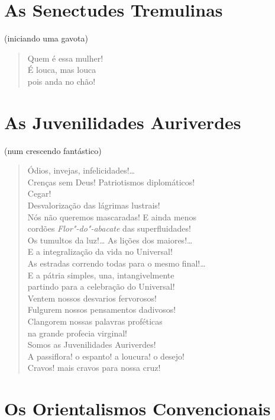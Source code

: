 \medskip
\section*{As Senectudes Tremulinas}

\hfill{}{\small(iniciando uma gavota)}

\begin{verse}
Quem é essa mulher!\\
É louca, mas louca\\
pois anda no chão!
\end{verse}

\medskip
\section*{As Juvenilidades Auriverdes}

\hfill{}{\small(num crescendo fantástico)}

\begin{verse}
Ódios, invejas, infelicidades!\ldots{}\\
Crenças sem Deus! Patriotismos diplomáticos!\\
Cegar!\\
Desvalorização das lágrimas lustrais!\\
Nós não queremos mascaradas! E ainda menos\\
cordões \emph{Flor"-do"-abacate} das superfluidades!\\
Os tumultos da luz!\ldots{} As lições dos maiores!\ldots{}\\
E a integralização da vida no Universal!\\
As estradas correndo todas para o mesmo final!\ldots{}\\
E a pátria simples, una, intangivelmente\\
partindo para a celebração do Universal!\\
Ventem nossos desvarios fervorosos!\\
Fulgurem nossos pensamentos dadivosos!\\
Clangorem nossas palavras proféticas\\
na grande profecia virginal!\\
Somos as Juvenilidades Auriverdes!\\
A passiflora! o espanto! a loucura! o desejo!\\
Cravos! mais cravos para nossa cruz!
\end{verse}

\medskip
\section*{Os Orientalismos Convencionais}


